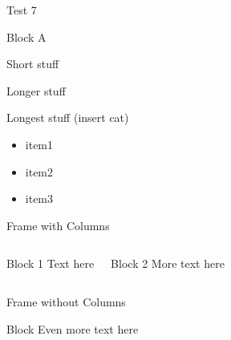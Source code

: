 \documentclass{beamer}
\begin{document}
	 \begin{frame}{Test 7}
            
         	\begin{block}{Block A}
            
                \begin{description}
                    \item[short] Short stuff
                    \item[long] Longer stuff
                    \item[longest label] Longest stuff (insert cat)
                \end{description}
            
                \begin{itemize}
                    \item item1
                    \item item2
                    \item item3
                \end{itemize}  
            \end{block}

        \end{frame}

        \begin{frame}[t]{Frame with Columns}
            \begin{columns}[t]

                \begin{block}{Block 1}
                    Text here
                \end{block}


                \begin{block}{Block 2}
                    More text here
                \end{block}
            \end{columns}
        \end{frame}

        \begin{frame}[t]{Frame without Columns}
            \leavevmode
            \begin{block}{Block}
                Even more text here
            \end{block}
        \end{frame}
\end{document}

